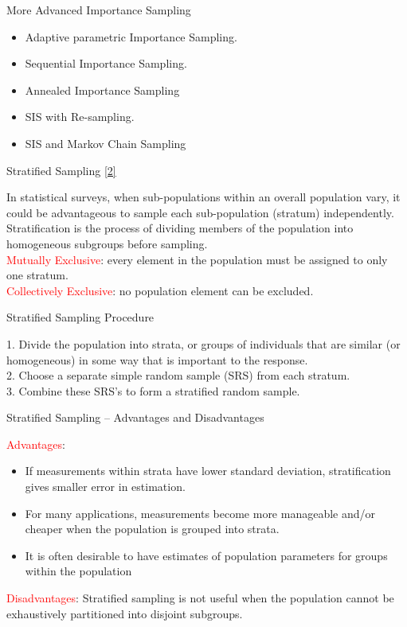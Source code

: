 \begin{frame}{More Advanced Importance Sampling}
\begin{itemize}
\item Adaptive parametric Importance Sampling.
\item Sequential Importance Sampling.
\item Annealed Importance Sampling
\item SIS with Re-sampling.
\item SIS and Markov Chain Sampling
\end{itemize}
\end{frame}

\begin{frame}{Stratified Sampling    \href{https://en.wikipedia.org/wiki/Stratified_sampling}{[2]}}

 In statistical surveys, when sub-populations within an overall population vary, it could be advantageous to sample each sub-population (stratum) independently. Stratification is the process of dividing members of the population into homogeneous subgroups before sampling. \\
 \textcolor{red}{Mutually Exclusive}: every element in the population must be assigned to only one stratum.\\
 \textcolor{red}{Collectively Exclusive}: no population element can be excluded.
 
\end{frame}

\begin{frame}{Stratified Sampling Procedure}

 1. Divide the population into strata, or groups of individuals that are similar (or homogeneous) in some way that is important to the response.\\
 2. Choose a separate simple random sample (SRS) from each stratum.\\
 3. Combine these SRS's to form a stratified random sample.
 
\end{frame}

\begin{frame}{Stratified Sampling -- Advantages and Disadvantages}

\textcolor{red}{Advantages}:
\begin{itemize}

\item If measurements within strata have lower standard deviation, stratification gives smaller error in estimation.
\item For many applications, measurements become more manageable and/or cheaper when the population is grouped into strata.
\item It is often desirable to have estimates of population parameters for groups within the population
\end{itemize}
\textcolor{red}{Disadvantages}:
Stratified sampling is not useful when the population cannot be exhaustively partitioned into disjoint subgroups.
\end{frame}

